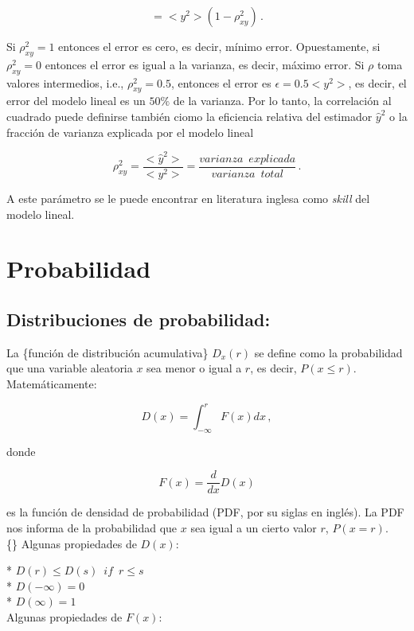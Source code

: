 \documentclass[
]{agujournal2019}
\begin{document}
\[=<y^2>(1-\rho^2_{xy})\,.\]

Si \(\rho^2_{xy}=1\) entonces el error es cero, es decir, mínimo error.
Opuestamente, si \(\rho^2_{xy}=0\) entonces el error es igual a la
varianza, es decir, máximo error. Si \(\rho\) toma valores intermedios,
i.e., \(\rho^2_{xy}=0.5\), entonces el error es \(\epsilon=0.5<y^2>\),
es decir, el error del modelo lineal es un \(50\%\) de la varianza. Por
lo tanto, la correlación al cuadrado puede definirse también ciomo la
eficiencia relativa del estimador \(\hat{y}^2\) o la fracción de
varianza explicada por el modelo lineal

\[\rho^2_{xy}=\frac{<\hat{y}^2>}{<y^2>}=\frac{{varianza\,\,\,explicada}}{{ varianza\,\,\,total}}\,.\]

A este parámetro se le puede encontrar en literatura inglesa como
\emph{skill} del modelo lineal.

\section{Probabilidad}\label{probabilidad}

\vspace{0.5cm}

\subsection{Distribuciones de
probabilidad:}\label{distribuciones-de-probabilidad}

La \{función de distribución acumulativa\} \(D_x(r)\) se define como la
probabilidad que una variable aleatoria \(x\) sea menor o igual a \(r\),
es decir, \(P(x\le r)\). Matemáticamente:

\[D(x)=\int^r_{-\infty}F(x)dx\,,\]

donde

\[F(x)=\frac{d}{dx} D(x)\]

es la función de densidad de probabilidad (PDF, por su siglas en
inglés). La PDF nos informa de la probabilidad que \(x\) sea igual a un
cierto valor \(r\), \(P(x=r)\).\\

\{\noindent\} Algunas propiedades de \(D(x)\):

\hfill\break
* \(D(r)\le D(s)\,\,\,{ if}\,\,\,r\le s\)\\
* \(D(-\infty)=0\)\\
* \(D(\infty)=1\)\\

Algunas propiedades de \(F(x)\):\\
\end{document}
